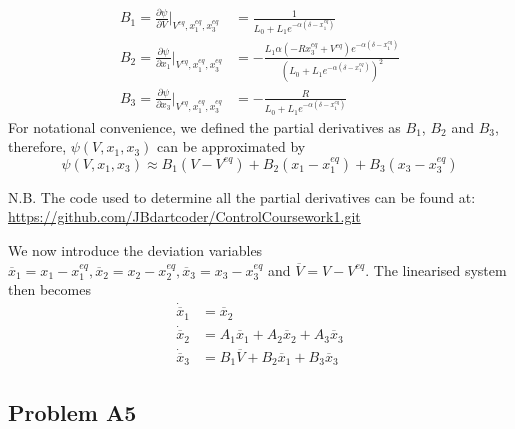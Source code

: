 \documentclass[a4paper,10pt,reqno]{amsart}
\numberwithin{equation}{section}
\begin{document}
\begin{subequations}\label{eq:psiDeriv}
     \begin{align}
        B_1 = \frac{\partial\psi}{\partial V}\Bigg|_{V^{eq}, x_1^{eq}, x_3^{eq}} &= \frac{1}{L_{0} + L_{1} e^{- \alpha \left(\delta - x_{1}^{eq}\right)}} \\
        B_2 = \frac{\partial\psi}{\partial x_1}\Bigg|_{V^{eq}, x_1^{eq}, x_3^{eq}} &= - \frac{L_{1} \alpha \left(- R x_{3}^{eq} + V^{eq}\right) e^{- \alpha \left(\delta - x_{1}^{eq}\right)}}{\left(L_{0} + L_{1} e^{- \alpha \left(\delta - x_{1}^{eq}\right)}\right)^{2}} \\
        B_3 = \frac{\partial\psi}{\partial x_3}\Bigg|_{V^{eq}, x_1^{eq}, x_3^{eq}} &= - \frac{R}{L_{0} + L_{1} e^{- \alpha \left(\delta - x_{1}^{eq}\right)}}
     \end{align}
\end{subequations}
For notational convenience, we defined the partial derivatives as $B_1$, $B_2$ and $B_3$, therefore, $\psi(V, x_1, x_3)$ can be approximated by
\begin{equation}
     \psi(V, x_1, x_3) \approx B_1(V - V^{eq}) + B_2(x_1 - x_1^{eq}) + B_3(x_3 - x_3^{eq})
\end{equation}

N.B. The code used to determine all the partial derivatives can be found at: \url{https://github.com/JBdartcoder/ControlCoursework1.git}

We now introduce the deviation variables $\overline{x}_1 = x_1-x_1^{eq}, \overline{x}_2 = x_2-x_2^{eq}, \overline{x}_3 = x_3-x_3^{eq}$ and $\overline{V} = V-V^{eq}$. The linearised system then becomes
\begin{subequations}\label{eq:linear_system}
     \begin{align}
          \dot{\overline{x}}_1 &= \overline{x}_2 \\
          \dot{\overline{x}}_2 &= A_1\overline{x}_1  + A_2\overline{x}_2 + A_3\overline{x}_3\\
          \dot{\overline{x}}_3 &= B_1\overline{V} + B_2\overline{x}_1 + B_3\overline{x}_3
     \end{align}
\end{subequations}

\subsection{Problem A5}\label{sec:a5}\hfill

\setlength{\jot}{5pt} %
\end{document}
